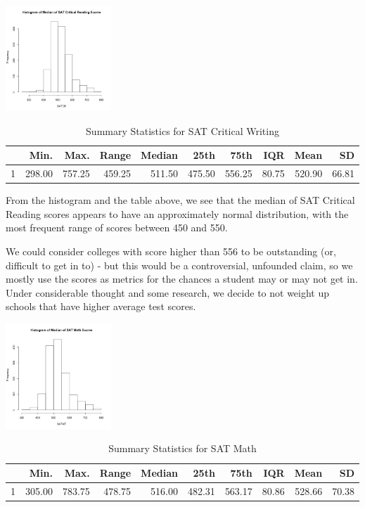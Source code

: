 \documentclass{article}\usepackage[]{graphicx}\usepackage[]{color}
\begin{document}
{\centering \includegraphics[width=150px]{../images/histogram-SATCRMedian} 

}


\begin{table}[ht]
\centering
\begin{tabular}{rrrrrrrrrr}
  \hline
 & Min. & Max. & Range & Median & 25th & 75th & IQR & Mean & SD \\ 
  \hline
1 & 298.00 & 757.25 & 459.25 & 511.50 & 475.50 & 556.25 & 80.75 & 520.90 & 66.81 \\ 
   \hline
\end{tabular}
\caption{Summary Statistics for SAT Critical Writing} 
\end{table}


From the histogram and the table above, we see that the median of SAT Critical Reading scores appears to have an approximately normal distribution, with the most frequent range of scores between 450 and 550. \newline

We could consider colleges with score higher than 556 to be outstanding (or, difficult to get in to) - but this would be a controversial, unfounded claim, so we mostly use the scores as metrics for the chances a student may or may not get in. Under considerable thought and some research, we decide to not weight up schools that have higher average test scores.



{\centering \includegraphics[width=150px]{../images/histogram-SATMTMedian} 

}


\begin{table}[ht]
\centering
\begin{tabular}{rrrrrrrrrr}
  \hline
 & Min. & Max. & Range & Median & 25th & 75th & IQR & Mean & SD \\ 
  \hline
1 & 305.00 & 783.75 & 478.75 & 516.00 & 482.31 & 563.17 & 80.86 & 528.66 & 70.38 \\ 
   \hline
\end{tabular}
\caption{Summary Statistics for SAT Math} 
\end{table}
\end{document}
